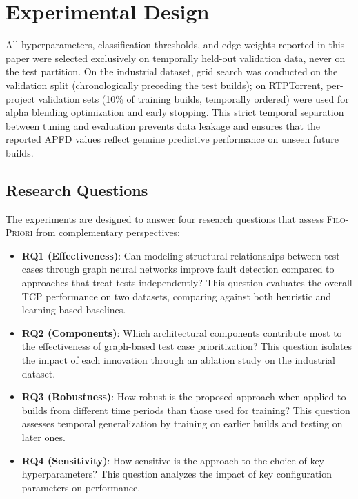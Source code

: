 \documentclass[10pt,journal,compsoc]{IEEEtran}
\newcommand{\filopriori}{\textsc{Filo-Priori}}
\begin{document}
\section{Experimental Design}
\label{sec:experimental}

All hyperparameters, classification thresholds, and edge weights reported
in this paper were selected exclusively on temporally held-out validation
data, never on the test partition. On the industrial dataset, grid search
was conducted on the validation split (chronologically preceding the test
builds); on RTPTorrent, per-project validation sets (10\% of training
builds, temporally ordered) were used for alpha blending optimization and
early stopping. This strict temporal separation between tuning and
evaluation prevents data leakage and ensures that the reported APFD
values reflect genuine predictive performance on unseen future builds.

\subsection{Research Questions}

The experiments are designed to answer four research questions that assess
\filopriori{} from complementary perspectives:

\begin{itemize}
    \item \textbf{RQ1 (Effectiveness)}: Can modeling structural relationships
    between test cases through graph neural networks improve fault detection
    compared to approaches that treat tests independently? This question evaluates
    the overall TCP performance on two datasets, comparing against both heuristic
    and learning-based baselines.
    \item \textbf{RQ2 (Components)}: Which architectural components contribute
    most to the effectiveness of graph-based test case prioritization? This question
    isolates the impact of each innovation through an ablation study on the
    industrial dataset.
    \item \textbf{RQ3 (Robustness)}: How robust is the proposed approach when
    applied to builds from different time periods than those used for training?
    This question assesses temporal generalization by training on earlier builds
    and testing on later ones.
    \item \textbf{RQ4 (Sensitivity)}: How sensitive is the approach to the choice
    of key hyperparameters? This question analyzes the impact of key configuration
    parameters on performance.
\end{itemize}
\end{document}

